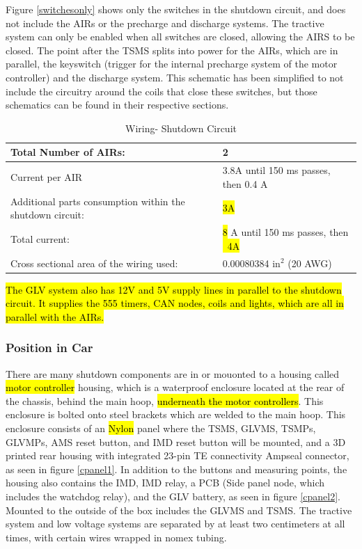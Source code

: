 \documentclass{article}
\DeclareRobustCommand{\hlr}[1]{{\sethlcolor{red}\hl{#1}}}
\begin{document}
            Figure \ref{switchesonly} shows only the switches in the shutdown circuit, and does not include the AIRs or the precharge and discharge systems. The tractive system can only be enabled when all switches are closed, allowing the AIRS to be closed. The point after the TSMS splits into power for the AIRs, which are in parallel, the keyswitch (trigger for the internal precharge system of the motor controller) and the discharge system. This schematic has been simplified to not include the circuitry around the coils that close these switches, but those schematics can be found in their respective sections.

            \begin{table}[H]
                \centering
                \begin{tabular}{|l|l|}
                \hline
                    Total Number of AIRs: & 2 \\ \hline
                    Current per AIR & 3.8A until 150 ms passes, then 0.4 A \\ \hline
                    Additional parts consumption within the shutdown circuit: & \hlr{3A}\\ \hline
                    Total current: & \hlr{8} A until 150 ms passes, then \hlr{~4A} \\ \hline
                    Cross sectional area of the wiring used: & 0.00080384 in$^{2}$ (20 AWG) \\ \hline
                \end{tabular}
                \caption{Wiring- Shutdown Circuit}
                \label{ShutdownCircuitTable}
            \end{table}

            \hlr{The GLV system also has 12V and 5V supply lines in parallel to the shutdown circuit. It supplies the 555 timers, CAN nodes, coils and lights, which are all in parallel with the AIRs.}

        \subsubsection{Position in Car}

        There are many shutdown components are in or mouonted to a housing called \hlr{motor controller} housing, which is a waterproof enclosure located at the rear of the chassis, behind the main hoop, \hlr{underneath the motor controllers}.  This enclosure is bolted onto steel brackets which are welded to the main hoop.  This enclosure consists of an \hlr{Nylon} panel where the TSMS, GLVMS, TSMPs, GLVMPs, AMS reset button, and IMD reset button will be mounted, and a 3D printed rear housing with integrated 23-pin TE connectivity Ampseal connector, as seen in figure \ref{cpanel1}. In addition to the buttons and measuring points, the housing also contains the IMD, IMD relay, a PCB (Side panel node, which includes the watchdog relay), and the GLV battery, as seen in figure \ref{cpanel2}.  Mounted to the outside of the box includes the GLVMS and TSMS. The tractive system and low voltage systems are separated by at least two centimeters at all times, with certain wires wrapped in nomex tubing.
\end{document}
